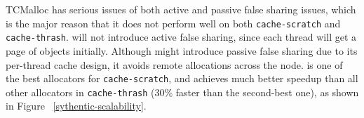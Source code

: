 TCMalloc has serious issues of both active and passive false sharing issues, which is the major reason that it does not perform well on both \texttt{cache-scratch} and \texttt{cache-thrash}. 
\NM{} will not introduce active false sharing, since each thread will get a page of objects initially. Although \NM{} might introduce passive false sharing due to its per-thread cache design, it avoids remote allocations across the node. 
 \NM{} is one of the best allocators for \texttt{cache-scratch}, and achieves much better speedup than all other allocators in \texttt{cache-thrash} (30\% faster than the second-best one), as shown in Figure ~\ref{sythentic-scalability}. 
 





